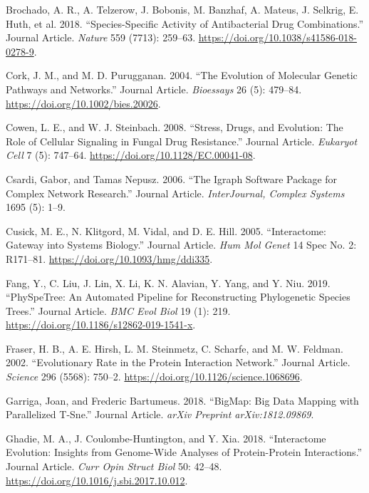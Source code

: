 \documentclass[]{elsarticle} %
\begin{document}
\leavevmode\hypertarget{ref-Brochado2018}{}%
Brochado, A. R., A. Telzerow, J. Bobonis, M. Banzhaf, A. Mateus, J. Selkrig, E. Huth, et al. 2018. ``Species-Specific Activity of Antibacterial Drug Combinations.'' Journal Article. \emph{Nature} 559 (7713): 259--63. \url{https://doi.org/10.1038/s41586-018-0278-9}.

\leavevmode\hypertarget{ref-Cork2004}{}%
Cork, J. M., and M. D. Purugganan. 2004. ``The Evolution of Molecular Genetic Pathways and Networks.'' Journal Article. \emph{Bioessays} 26 (5): 479--84. \url{https://doi.org/10.1002/bies.20026}.

\leavevmode\hypertarget{ref-Cowen2008}{}%
Cowen, L. E., and W. J. Steinbach. 2008. ``Stress, Drugs, and Evolution: The Role of Cellular Signaling in Fungal Drug Resistance.'' Journal Article. \emph{Eukaryot Cell} 7 (5): 747--64. \url{https://doi.org/10.1128/EC.00041-08}.

\leavevmode\hypertarget{ref-Csardi2016}{}%
Csardi, Gabor, and Tamas Nepusz. 2006. ``The Igraph Software Package for Complex Network Research.'' Journal Article. \emph{InterJournal, Complex Systems} 1695 (5): 1--9.

\leavevmode\hypertarget{ref-Cusick2005}{}%
Cusick, M. E., N. Klitgord, M. Vidal, and D. E. Hill. 2005. ``Interactome: Gateway into Systems Biology.'' Journal Article. \emph{Hum Mol Genet} 14 Spec No. 2: R171--81. \url{https://doi.org/10.1093/hmg/ddi335}.

\leavevmode\hypertarget{ref-Fang2019}{}%
Fang, Y., C. Liu, J. Lin, X. Li, K. N. Alavian, Y. Yang, and Y. Niu. 2019. ``PhySpeTree: An Automated Pipeline for Reconstructing Phylogenetic Species Trees.'' Journal Article. \emph{BMC Evol Biol} 19 (1): 219. \url{https://doi.org/10.1186/s12862-019-1541-x}.

\leavevmode\hypertarget{ref-Fraser2002}{}%
Fraser, H. B., A. E. Hirsh, L. M. Steinmetz, C. Scharfe, and M. W. Feldman. 2002. ``Evolutionary Rate in the Protein Interaction Network.'' Journal Article. \emph{Science} 296 (5568): 750--2. \url{https://doi.org/10.1126/science.1068696}.

\leavevmode\hypertarget{ref-Garriga2018}{}%
Garriga, Joan, and Frederic Bartumeus. 2018. ``BigMap: Big Data Mapping with Parallelized T-Sne.'' Journal Article. \emph{arXiv Preprint arXiv:1812.09869}.

\leavevmode\hypertarget{ref-Ghadie2018}{}%
Ghadie, M. A., J. Coulombe-Huntington, and Y. Xia. 2018. ``Interactome Evolution: Insights from Genome-Wide Analyses of Protein-Protein Interactions.'' Journal Article. \emph{Curr Opin Struct Biol} 50: 42--48. \url{https://doi.org/10.1016/j.sbi.2017.10.012}.
\end{document}
